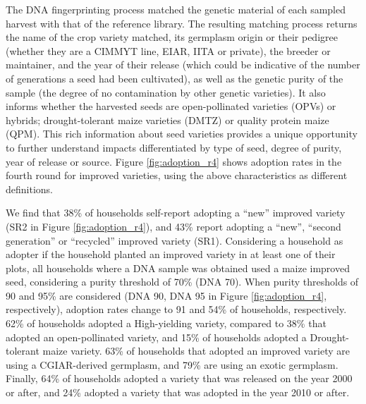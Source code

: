 \documentclass{article}
\begin{document}
The DNA fingerprinting process matched the genetic material of each sampled harvest with that of the reference library. The resulting matching process returns the name of the crop variety matched, its germplasm origin or their pedigree (whether they are a CIMMYT line, EIAR, IITA or private), the breeder or maintainer, and the year of their release (which could be indicative of the number of generations a seed had been cultivated), as well as the genetic purity of the sample (the degree of no contamination by other genetic varieties). It also informs whether the harvested seeds are open-pollinated varieties (OPVs) or hybrids; drought-tolerant maize varieties (DMTZ) or quality protein maize (QPM). This rich information about seed varieties provides a unique opportunity to further understand impacts differentiated by type of seed, degree of purity, year of release or source. Figure \ref{fig:adoption_r4} shows adoption rates in the fourth round for improved varieties, using the above characteristics as different definitions.

We find that 38\% of households self-report adopting a “new” improved variety (SR2 in Figure \ref{fig:adoption_r4}), and 43\% report adopting a “new”, “second generation” or “recycled” improved variety (SR1). Considering a household as adopter if the household planted an improved variety in at least one of their plots, all households where a DNA sample was obtained used a maize improved seed, considering a purity threshold of 70\% (DNA 70). When purity thresholds of 90 and 95\% are considered (DNA 90, DNA 95 in Figure \ref{fig:adoption_r4}, respectively), adoption rates change to 91 and 54\% of households, respectively. 62\% of households adopted a High-yielding variety, compared to 38\% that adopted an open-pollinated variety, and 15\% of households adopted a Drought-tolerant maize variety. 63\% of households that adopted an improved variety are using a CGIAR-derived germplasm, and 79\% are using an exotic germplasm. Finally, 64\% of households adopted a variety that was released on the year 2000 or after, and 24\% adopted a variety that was adopted in the year 2010 or after.
\end{document}
